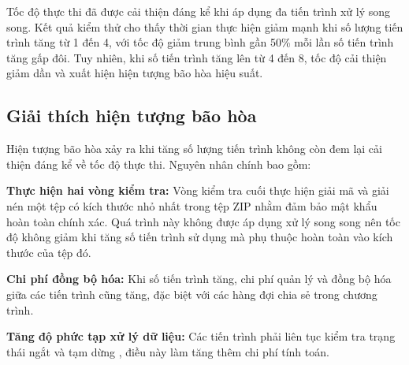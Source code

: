\documentclass[../DoAn.tex]{subfiles}
\begin{document}
Tốc độ thực thi đã được cải thiện đáng kể khi áp dụng đa tiến trình xử lý song song. Kết quả kiểm thử cho thấy thời gian thực hiện giảm mạnh khi số lượng tiến trình tăng từ 1 đến 4, với tốc độ giảm trung bình gần 50\% mỗi lần số tiến trình tăng gấp đôi. Tuy nhiên, khi số tiến trình tăng lên từ 4 đến 8, tốc độ cải thiện giảm dần và xuất hiện hiện tượng bão hòa hiệu suất.

\subsection{Giải thích hiện tượng bão hòa}

Hiện tượng bão hòa xảy ra khi tăng số lượng tiến trình không còn đem lại cải thiện đáng kể về tốc độ thực thi. Nguyên nhân chính bao gồm:

\textbf{Thực hiện hai vòng kiểm tra:} Vòng kiểm tra cuối thực hiện giải mã và giải nén một tệp có kích thước nhỏ nhất trong tệp ZIP nhằm đảm bảo mật khẩu hoàn toàn chính xác. Quá trình này không được áp dụng xử lý song song nên tốc độ không giảm khi tăng số tiến trình sử dụng mà phụ thuộc hoàn toàn vào kích thước của tệp đó.

\textbf{Chi phí đồng bộ hóa: }Khi số tiến trình tăng, chi phí quản lý và đồng bộ hóa giữa các tiến trình cũng tăng, đặc biệt với các hàng đợi chia sẻ trong chương trình.

\textbf{Tăng độ phức tạp xử lý dữ liệu: }Các tiến trình phải liên tục kiểm tra trạng thái ngắt và tạm dừng , điều này làm tăng thêm chi phí tính toán.
\end{document}

